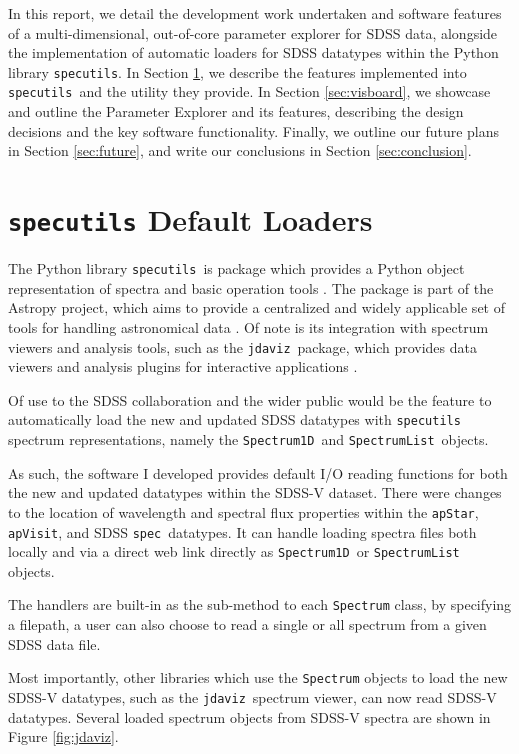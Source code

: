 \documentclass[a4paper,10pt,twocolumn]{article}
\newcommand{\specutils}{\texttt{specutils}}
\newcommand{\jdaviz}{\texttt{jdaviz}}
\begin{document}
In this report, we detail the development work undertaken and software features of a multi-dimensional, out-of-core parameter explorer for SDSS data, alongside the implementation of automatic loaders for SDSS datatypes within the Python library \specutils. In Section \ref{sec:specutils}, we describe the features implemented into \specutils\, and the utility they provide. In Section \ref{sec:visboard}, we showcase and outline the Parameter Explorer and its features, describing the design decisions and the key software functionality. Finally, we outline our future plans in Section \ref{sec:future}, and write our conclusions in Section \ref{sec:conclusion}.


\section{\texttt{specutils} Default Loaders}
\label{sec:specutils}
The Python library \specutils\, is package which provides a Python object representation of spectra and basic operation tools \parencite{specutils}. The package is part of the Astropy project, which aims to provide a centralized and widely applicable set of tools for handling astronomical data \parencite{astropyarticle}. Of note is its integration with spectrum viewers and analysis tools, such as the \jdaviz\, package, which provides data viewers and analysis plugins for interactive applications \parencite{jdavizarticle}.

Of use to the SDSS collaboration and the wider public would be the feature to automatically load the new and updated SDSS datatypes with \specutils\, spectrum representations, namely the \texttt{Spectrum1D}\, and \texttt{SpectrumList}\, objects.

As such, the software I developed provides default I/O reading functions for both the new and updated datatypes within the SDSS-V dataset. There were changes to the location of wavelength and spectral flux properties within the \texttt{apStar}, \texttt{apVisit}, and SDSS \texttt{spec}\, datatypes. It can handle loading spectra files both locally and via a direct web link directly as \texttt{Spectrum1D}\, or \texttt{SpectrumList}\, objects.

The handlers are built-in as the sub-method to each \texttt{Spectrum} class, by specifying a filepath, a user can also choose to read a single or all spectrum from a given SDSS data file.

Most importantly, other libraries which use the \texttt{Spectrum} objects to load the new SDSS-V datatypes, such as the \jdaviz\, spectrum viewer, can now read SDSS-V datatypes. Several loaded spectrum objects from SDSS-V spectra are shown in Figure \ref{fig:jdaviz}.
\end{document}
